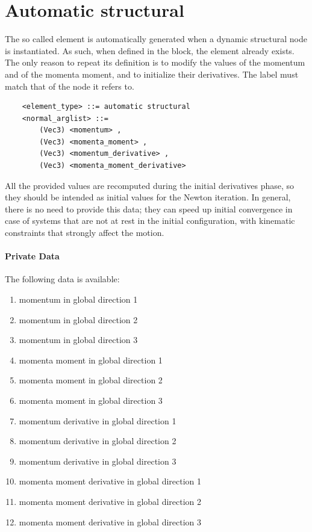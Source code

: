 \section{Automatic structural}
The so called  element is automatically generated
when a dynamic structural node is instantiated.
As such, when defined in the  block,
the element already exists.
The only reason to repeat its definition is to modify the values
of the momentum and of the momenta moment, and to initialize
their derivatives.
The label must match that of the node it refers to.
\begin{verbatim}
    <element_type> ::= automatic structural
    <normal_arglist> ::=
        (Vec3) <momentum> ,
        (Vec3) <momenta_moment> ,
        (Vec3) <momentum_derivative> ,
        (Vec3) <momenta_moment_derivative>
\end{verbatim}
All the provided values are recomputed during the initial derivatives phase,
so they should be intended as initial values for the Newton iteration.
In general, there is no need to provide this data; they can speed up
initial convergence in case of systems that are not at rest in the initial
configuration, with kinematic constraints that strongly affect
the motion.

\paragraph{Private Data}
The following data is available:
\begin{enumerate}
\item {} momentum in global direction 1
\item {} momentum in global direction 2
\item {} momentum in global direction 3
\item {} momenta moment in global direction 1
\item {} momenta moment in global direction 2
\item {} momenta moment in global direction 3
\item {} momentum derivative in global direction 1
\item {} momentum derivative in global direction 2
\item {} momentum derivative in global direction 3
\item {} momenta moment derivative in global direction 1
\item {} momenta moment derivative in global direction 2
\item {} momenta moment derivative in global direction 3
\end{enumerate}



